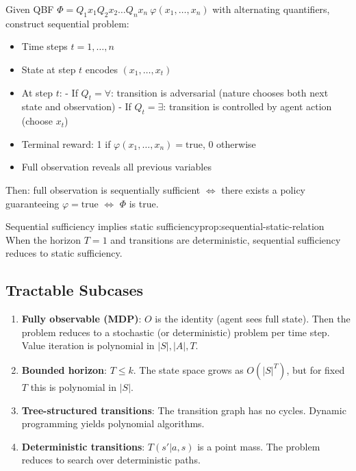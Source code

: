 
\begin{construction}\label{constr:tqbf-to-sequential}
Given QBF $\Phi = Q_1 x_1 Q_2 x_2 \ldots Q_n x_n\ \varphi(x_1, \ldots, x_n)$ with alternating quantifiers, construct sequential problem:
\begin{itemize}
\item Time steps $t = 1, \ldots, n$
\item State at step $t$ encodes $(x_1, \ldots, x_t)$
\item At step $t$:
  - If $Q_t = \forall$: transition is adversarial (nature chooses both next state and observation)
  - If $Q_t = \exists$: transition is controlled by agent action (choose $x_t$)
\item Terminal reward: 1 if $\varphi(x_1, \ldots, x_n) = \text{true}$, 0 otherwise
\item Full observation reveals all previous variables
\end{itemize}
Then: full observation is sequentially sufficient $\iff$ there exists a policy guaranteeing $\varphi = \text{true}$ $\iff$ $\Phi$ is true.
\end{construction}


\begin{claim}{Sequential sufficiency implies static sufficiency}{prop:sequential-static-relation}
When the horizon $T = 1$ and transitions are deterministic, sequential sufficiency reduces to static sufficiency.
\end{claim}


\subsection{Tractable Subcases}

\begin{enumerate}
\item \textbf{Fully observable (MDP)}: $O$ is the identity (agent sees full state). Then the problem reduces to a stochastic (or deterministic) problem per time step. Value iteration is polynomial in $|S|, |A|, T$.

\item \textbf{Bounded horizon}: $T \leq k$. The state space grows as $O(|S|^T)$, but for fixed $T$ this is polynomial in $|S|$.

\item \textbf{Tree-structured transitions}: The transition graph has no cycles. Dynamic programming yields polynomial algorithms.

\item \textbf{Deterministic transitions}: $T(s'|a,s)$ is a point mass. The problem reduces to search over deterministic paths.
\end{enumerate}

